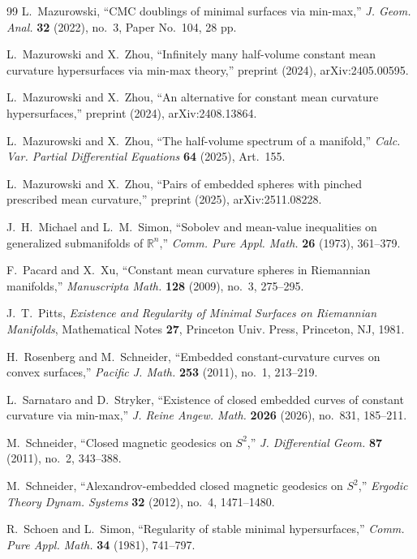 \documentclass[12pt,english]{article}
\theoremstyle{definition}
\begin{document}
\begin{thebibliography}{99}
 L.~Mazurowski, ``CMC doublings of minimal surfaces via min-max,'' \textit{J. Geom. Anal.} \textbf{32} (2022), no.~3, Paper No.~104, 28 pp.

 L.~Mazurowski and X.~Zhou, ``Infinitely many half-volume constant mean curvature hypersurfaces via min-max theory,'' preprint (2024), arXiv:2405.00595.

 L.~Mazurowski and X.~Zhou, ``An alternative for constant mean curvature hypersurfaces,'' preprint (2024), arXiv:2408.13864.

 L.~Mazurowski and X.~Zhou, ``The half-volume spectrum of a manifold,'' \textit{Calc. Var. Partial Differential Equations} \textbf{64} (2025), Art.~155.

 L.~Mazurowski and X.~Zhou, ``Pairs of embedded spheres with pinched prescribed mean curvature,'' preprint (2025), 	arXiv:2511.08228.

 J.~H.~Michael and L.~M.~Simon, ``Sobolev and mean-value inequalities on generalized submanifolds of $\mathbb{R}^n$,'' \textit{Comm. Pure Appl. Math.} \textbf{26} (1973), 361--379.

 F.~Pacard and X.~Xu, ``Constant mean curvature spheres in Riemannian manifolds,'' \textit{Manuscripta Math.} \textbf{128} (2009), no.~3, 275--295.

 J.~T.~Pitts, \textit{Existence and Regularity of Minimal Surfaces on Riemannian Manifolds}, Mathematical Notes \textbf{27}, Princeton Univ. Press, Princeton, NJ, 1981.

 H.~Rosenberg and M.~Schneider, ``Embedded constant-curvature curves on convex surfaces,'' \textit{Pacific J. Math.} \textbf{253} (2011), no.~1, 213--219.

 L.~Sarnataro and D.~Stryker, ``Existence of closed embedded curves of constant curvature via min-max,'' \textit{J. Reine Angew. Math.} \textbf{2026} (2026), no.~831, 185--211.

 M.~Schneider, ``Closed magnetic geodesics on $S^2$,'' \textit{J. Differential Geom.} \textbf{87} (2011), no.~2, 343--388.

 M.~Schneider, ``Alexandrov-embedded closed magnetic geodesics on $S^2$,'' \textit{Ergodic Theory Dynam. Systems} \textbf{32} (2012), no.~4, 1471--1480.

 R.~Schoen and L.~Simon, ``Regularity of stable minimal hypersurfaces,'' \textit{Comm. Pure Appl. Math.} \textbf{34} (1981), 741--797.


\end{thebibliography}
\end{document}
